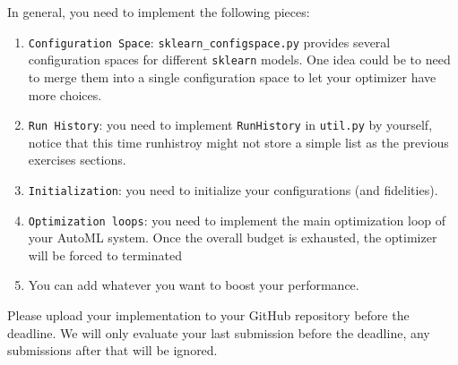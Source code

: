\documentclass{exam}
\begin{document}
	In general, you need to implement the following pieces:
	\begin{enumerate}
	    \item \texttt{Configuration Space}:   \texttt{sklearn\_configspace.py} provides several configuration spaces for different \texttt{sklearn} models. One idea could be to need to merge them into a single configuration space to let your optimizer have more choices.
	    \item \texttt{Run History}: you need to implement \texttt{RunHistory} in \texttt{util.py} by yourself, notice that this time runhistroy might not store a simple list as the previous exercises sections. 
	    \item \texttt{Initialization}: you need to initialize your configurations (and fidelities). %
	    \item \texttt{Optimization loops}: you need to implement the main optimization loop of your AutoML system. Once the overall budget is exhausted, the optimizer will be forced to terminated
	    \item You can add whatever you want to boost your performance.
	\end{enumerate}
	Please upload your implementation to your GitHub repository before the deadline. We will only evaluate your last submission before the deadline, any submissions after that will be ignored. 
	
\end{document}

